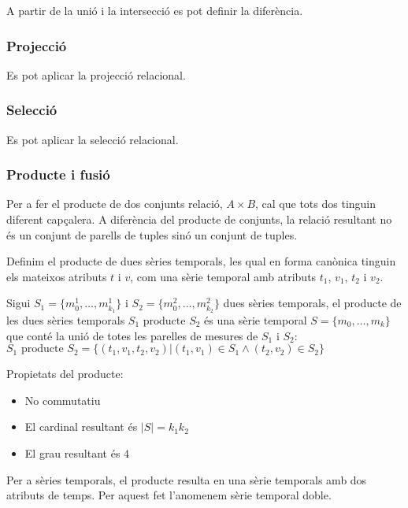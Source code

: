 A partir de la unió i la intersecció es pot definir la diferència.



\subsubsection{Projecció}


Es pot aplicar la projecció relacional.


\subsubsection{Selecció}


Es pot aplicar la selecció relacional.






\subsubsection{Producte i fusió}


Per a fer el producte de dos conjunts relació, $A \times B$, cal que
tots dos tinguin diferent capçalera. A diferència del producte de
conjunts, la relació resultant no és un conjunt de parells de tuples
sinó un conjunt de tuples. 


Definim el producte de dues sèries temporals, les qual en forma
canònica tinguin els mateixos atributs $t$ i $v$, com una sèrie
temporal amb atributs $t_1$, $v_1$, $t_2$ i $v_2$.
\begin{definition}[producte]
  Sigui $S_1=\{m_0^1, \dotsc, m_{k_1}^1\}$ i $S_2=\{m_0^2, \dotsc,
  m_{k_2}^2\}$ dues sèries temporals, el producte de les dues sèries
  temporals $S_1 \text{ producte } S_2$ és una sèrie temporal $S=\{m_0, \dotsc,
  m_k\}$ que conté la unió de totes les parelles de mesures de $S_1$ i
  $S_2$: $S_1 \text{ producte } S_2 = \{ (t_1,v_1,t_2,v_2) | (t_1,v_1) \in S_1
  \wedge (t_2,v_2) \in S_2 \}$
\end{definition}

Propietats del producte:
\begin{itemize}
\item No commutatiu
\item El cardinal resultant és $|S|=k_1k_2$
\item El grau resultant és $4$
\end{itemize}


Per a sèries temporals, el producte resulta en una sèrie temporals amb
dos atributs de temps. Per aquest fet l'anomenem sèrie temporal doble.



